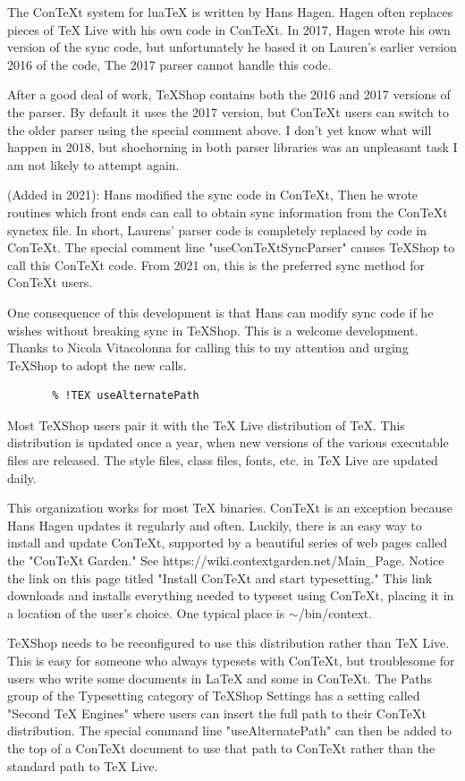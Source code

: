 \documentclass[11pt, oneside]{article}   	%
\begin{document}
The ConTeXt system for luaTeX is written by Hans Hagen. Hagen often replaces pieces of TeX Live with his own code in ConTeXt. In 2017, Hagen wrote his own version of the sync code, but unfortunately he based it on Lauren's earlier version 2016 of the code, The 2017 parser cannot handle this code.

After a good deal of work, TeXShop contains both the 2016 and 2017 versions of the parser. By default it uses the 2017 version, but ConTeXt users can switch to the older parser using the special comment above. I don't yet know what will happen in 2018, but shoehorning in both parser libraries was an unpleasant task I am not likely to attempt again.

(Added in 2021): Hans modified the sync code in ConTeXt, Then he wrote routines which front ends can call to obtain  sync information from the ConTeXt synctex file. In short, Laurens' parser code is completely replaced by code in ConTeXt. The special comment line "useConTeXtSyncParser" causes TeXShop to call this ConTeXt code. From 2021 on, this is the preferred sync method for ConTeXt users. 

One consequence of this development is that Hans can  modify sync code if he wishes without breaking sync in TeXShop. This is a welcome development. Thanks to Nicola Vitacolonna for calling this to my attention and urging TeXShop to adopt the new calls.


\begin{verbatim}
       % !TEX useAlternatePath
\end{verbatim}
 
 Most TeXShop users pair it with the TeX Live distribution of TeX. This distribution is updated once a year, when new versions of the various executable files are released. The style files, class files, fonts, etc. in TeX Live are updated daily.
 
 This organization works for most TeX binaries. ConTeXt is an exception because Hans Hagen updates it regularly and often. Luckily, there is an easy way to install and update ConTeXt, supported by a beautiful series of web pages called the "ConTeXt Garden." See https://wiki.contextgarden.net/Main\_Page. Notice the link on this page titled "Install ConTeXt and start typesetting." This link downloads and installs everything needed to typeset using ConTeXt, placing it in a location of the user's choice. One typical place is $\sim$/bin/context. 
 
TeXShop needs to be reconfigured to use this distribution rather than TeX Live. This is easy for someone who always typesets with ConTeXt, but troublesome for users who write some documents in LaTeX and some in ConTeXt. The Paths group of the Typesetting category of TeXShop Settings has a setting called "Second TeX Engines" where users can insert the full path to their ConTeXt distribution. The special command line "useAlternatePath" can then be added to the top of a ConTeXt document to use that path to ConTeXt rather than the standard path to TeX Live.
\end{document}
